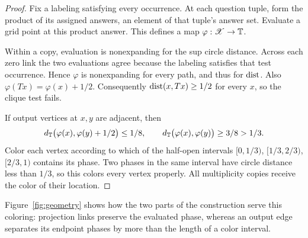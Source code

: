 \begin{proof}
Fix a labeling satisfying every occurrence. At each question tuple,
form the product of its assigned answers, an element of that tuple's
answer set. Evaluate a grid point at this product answer.
This defines a map $\varphi:\mathscr X\to\mathbb T$.

Within a copy, evaluation is nonexpanding for the sup circle distance.
Across each zero link the two evaluations agree because the labeling
satisfies that test occurrence. Hence $\varphi$ is nonexpanding for
every path, and thus for $\operatorname{dist}$.
Also $\varphi(Tx)=\varphi(x)+1/2$.
Consequently $\operatorname{dist}(x,Tx)\ge1/2$ for every $x$, so the clique test fails.

If output vertices at $x,y$ are adjacent, then
\[
 d_{\mathbb T}\bigl(\varphi(x),\varphi(y)+1/2\bigr)\le1/8,
 \qquad
 d_{\mathbb T}\bigl(\varphi(x),\varphi(y)\bigr)\ge3/8>1/3.
\]
Color each vertex according to which of the half-open intervals
$[0,1/3)$, $[1/3,2/3)$, $[2/3,1)$ contains its phase.
Two phases in the same interval have circle distance less than $1/3$,
so this colors every vertex properly. All multiplicity copies receive
the color of their location.
\end{proof}

Figure~\ref{fig:geometry} shows how the two parts of the construction
serve this coloring: projection links preserve the evaluated phase,
whereas an output edge separates its endpoint phases by more than the
length of a color interval.

